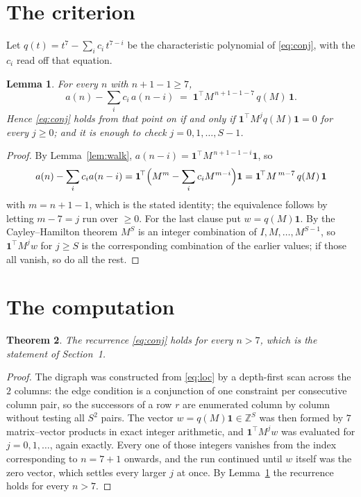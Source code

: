 \documentclass[11pt,a4paper]{article}
\theoremstyle{plain}
\newtheorem{theorem}{Theorem}
\newtheorem{lemma}[theorem]{Lemma}
\theoremstyle{definition}
\begin{document}
\section{The criterion}

Let $q(t)=t^{7}-\sum_i c_i\,t^{7-i}$ be the characteristic polynomial of
\eqref{eq:conj}, with the $c_i$ read off that equation.

\begin{lemma}\label{lem:crit}
For every $n$ with $n+1-1\ge7$,
\[
a(n)-\sum_i c_i\,a(n-i)\;=\;\mathbf{1}^{\!\top}M^{\,n+1-1-7}\,q(M)\,\mathbf{1} .
\]
Hence \eqref{eq:conj} holds from that point on if and only if
$\mathbf{1}^{\!\top}M^{j}q(M)\mathbf{1}=0$ for every $j\ge0$; and it is enough to check
$j=0,1,\dots,S-1$.
\end{lemma}

\begin{proof}
By Lemma~\ref{lem:walk}, $a(n-i)=\mathbf{1}^{\!\top}M^{\,n+1-1-i}\mathbf{1}$, so
\[
a(n)-\sum_i c_i a(n-i)
=\mathbf{1}^{\!\top}\Bigl(M^{m}-\sum_i c_i M^{m-i}\Bigr)\mathbf{1}
=\mathbf{1}^{\!\top}M^{\,m-7}\,q(M)\,\mathbf{1}
\]
with $m=n+1-1$, which is the stated identity; the equivalence follows by letting
$m-7=j$ run over $\ge0$. For the last clause put $w=q(M)\mathbf{1}$. By the
Cayley--Hamilton theorem $M^{S}$ is an integer combination of $I,M,\dots,M^{S-1}$, so
$\mathbf{1}^{\!\top}M^{j}w$ for $j\ge S$ is the corresponding combination of the earlier
values; if those all vanish, so do all the rest.
\end{proof}

\section{The computation}

\begin{theorem}
The recurrence \eqref{eq:conj} holds for every $n>7$, which is the statement of
Section~1.
\end{theorem}

\begin{proof}
The digraph was constructed from \eqref{eq:loc} by a depth-first scan across the $2$
columns: the edge condition is a conjunction of one constraint per consecutive column
pair, so the successors of a row $r$ are enumerated column by column without testing all
$S^2$ pairs. The vector $w=q(M)\mathbf{1}\in\mathbb{Z}^{S}$ was then formed by $7$
matrix--vector products in exact integer arithmetic, and $\mathbf{1}^{\!\top}M^{j}w$ was
evaluated for $j=0,1,\dots$, again exactly. Every one of those integers vanishes from the
index corresponding to $n=7+1$ onwards, and the run continued until $w$ itself was the
zero vector, which settles every larger $j$ at once. By Lemma~\ref{lem:crit} the recurrence
holds for every $n>7$.
\end{proof}
\end{document}
